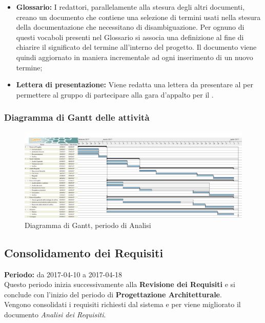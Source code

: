 \begin{itemize}
		\item \textbf{Glossario:} I redattori, parallelamente alla stesura degli altri documenti, creano un documento che contiene una selezione di termini usati nella stesura della documentazione che necessitano di disambiguazione. Per ognuno di questi vocaboli presenti nel Glossario si associa una definizione al fine di chiarire il significato del termine all'interno del progetto. Il documento viene quindi aggiornato in maniera incrementale ad ogni inserimento di un nuovo termine;
		\item \textbf{Lettera di presentazione:} Viene redatta una lettera da presentare al  per permettere al gruppo di partecipare alla gara d'appalto per il . \\
	\end{itemize}
	\subsubsection{Diagramma di Gantt delle attività}
	\begin{figure}[H]
		\centering
		\includegraphics[width=1\linewidth]{immagini/gantt/analisi.png}
		\caption{Diagramma di Gantt, periodo di Analisi}
	\end{figure}
	\subsection{Consolidamento dei Requisiti}
	\textbf{Periodo:} da 2017-04-10 a 2017-04-18 \\
	Questo periodo inizia successivamente alla \textbf{Revisione dei Requisiti} e si conclude con l'inizio del periodo di \textbf{Progettazione Architetturale}. \\
	Vengono consolidati i requisiti richiesti dal sistema e per viene migliorato il documento \textit{Analisi dei Requisiti}. \\
